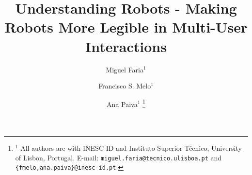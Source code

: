\documentclass[letterpaper, 10 pt, conference]{ieeeconf}
\begin{document}
\title{\LARGE \bf
Understanding Robots - Making Robots More Legible in Multi-User Interactions
}


\author{Miguel Faria$^{1}$ \and Francisco S. Melo$^{1}$ \and Ana Paiva$^{1}$%
\thanks{$^{1}$ All authors are with INESC-ID and Instituto Superior T\'{e}cnico, University of Lisbon, Portugal. E-mail:
        {\tt\small miguel.faria@tecnico.ulisboa.pt} and {\tt\small\{fmelo,ana.paiva\}@inesc-id.pt}.}%
}






% 
\end{document}
